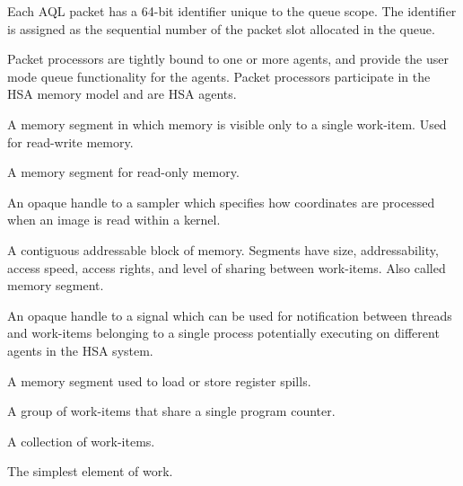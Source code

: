 \documentclass[final,oneside]{book}
\begin{document}
\begin{description}[itemsep=5pt,leftmargin=0cm, labelindent=0cm]
\item[Packet ID] Each AQL packet has a 64-bit identifier unique to the queue
  scope. The identifier is assigned as the sequential number of the packet slot
  allocated in the queue.

\item[Packet processor] Packet processors are tightly bound to one or more
  agents, and provide the user mode queue functionality for the agents. Packet
  processors participate in the HSA memory model and are HSA agents.

\item[Private segment] A memory segment in which memory is visible only to a
  single work-item. Used for read-write memory.

\item[Readonly segment] A memory segment for read-only memory.

\item[Sampler handle] An opaque handle to a sampler which specifies how
  coordinates are processed when an image is read within a kernel.

\item[Segment] A contiguous addressable block of memory. Segments have size,
  addressability, access speed, access rights, and level of sharing between
  work-items. Also called memory segment.

\item[Signal (handle)] An opaque handle to a signal which can be used for
  notification between threads and work-items belonging to a single process
  potentially executing on different agents in the HSA system.

\item[Spill segment] A memory segment used to load or store register spills.

\item[Wavefront] A group of work-items that share a single program counter.

\item[Work-group] A collection of work-items.

\item[Work-item] The simplest element of work.

\end{description}

\newpage
{}
\printindex[api]
\printindex[ext]


\begin{thebibliography}{30}



\end{thebibliography}
\end{document}
